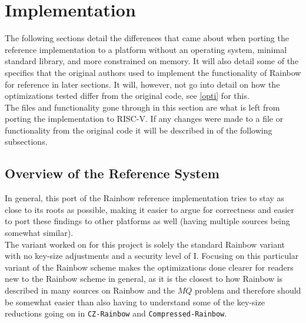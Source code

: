 \section{Implementation}
The following sections detail the differences that came about when porting the reference implementation \cite{rainbowgit} to a platform without an operating system, minimal standard library, and more constrained on memory. It will also detail some of the specifics that the original authors used to implement the functionality of Rainbow for reference in later sections. It will, however, not go into detail on how the optimizations tested differ from the original code, see \cref{opti} for this.
\medskip\\
The files and functionality gone through in this section are what is left from porting the implementation to RISC-V. If any changes were made to a file or functionality from the original code it will be described in of the following subsections.
\subsection{Overview of the Reference System}
In general, this port of the Rainbow reference implementation tries to stay as close to its roots as possible, making it easier to argue for correctness and easier to port these findings to other platforms as well (having multiple sources being somewhat similar).
\medskip\\
The variant worked on for this project is solely the standard Rainbow variant with no key-size adjustments and a security level of I. Focusing on this particular variant of the Rainbow scheme makes the optimizations done clearer for readers new to the Rainbow scheme in general, as it is the closest to how Rainbow is described in many sources on Rainbow and the $MQ$ problem and therefore should be somewhat easier than also having to understand some of the key-size reductions going on in \texttt{CZ-Rainbow} and \texttt{Compressed-Rainbow}.
